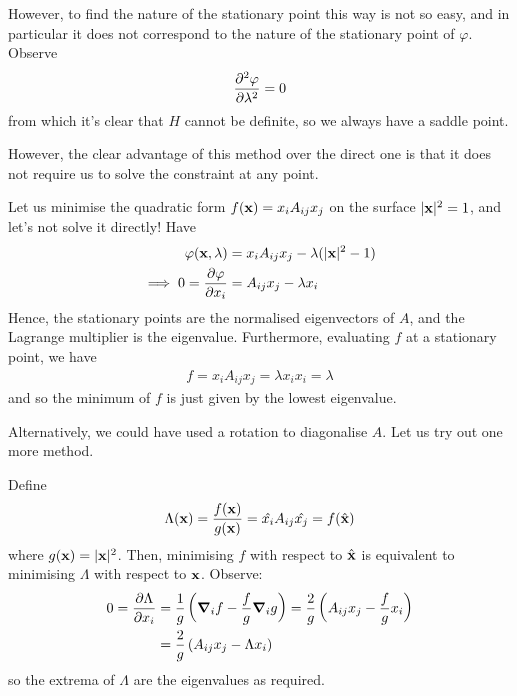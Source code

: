 \documentclass{../../template/note}
\begin{document}
    However, to find the nature of the stationary point this way is not so easy, and in particular it does not correspond to the nature of the stationary point of $\varphi$. Observe
    \begin{align*}
        \pd{^2\varphi}{\lambda^2} = 0
    \end{align*}
    from which it's clear that $H$ cannot be definite, so we always have a saddle point.

    However, the clear advantage of this method over the direct one is that it does not require us to solve the constraint at any point.
    
    \begin{example*}
        Let us minimise the quadratic form $f(\V x) = x_iA_{ij}x_j$ on the surface $|\V x|^2 = 1$, and let's not solve it directly! Have
        \begin{align*}
            \varphi(\V x, \lambda) &= x_i A_{ij} x_j - \lambda(|\V x|^2 - 1) \\
            \implies 0 = \pd{\varphi}{x_i} &= A_{ij} x_j - \lambda x_i
        \end{align*}
        Hence, the stationary points are the normalised eigenvectors of $A$, and the Lagrange multiplier is the eigenvalue. Furthermore, evaluating $f$ at a stationary point, we have
        \begin{align*}
            f = x_i A_{ij} x_j = \lambda x_i x_i = \lambda
        \end{align*}
        and so the minimum of $f$ is just given by the lowest eigenvalue.
    \end{example*}
    
    Alternatively, we could have used a rotation to diagonalise $A$. Let us try out one more method.
    
    \begin{example*}
        Define
        \begin{align*}
            \Lambda(\V x) = \frac{f(\V x)}{g(\V x)} = \hat{x_i} A_{ij} \hat{x_j} = f(\hvec x)
        \end{align*}
        where $g(\V x) = |\V x|^2$. Then, minimising $f$ with respect to $\hvec x$ is equivalent to minimising $\Lambda$ with respect to $\V x$. Observe:
        \begin{align*}
            0 = \pd{\Lambda}{x_i} &= \frac 1 g \left(\grad_i f - \frac f g \grad_i g\right) = \frac 2 g \left(A_{ij} x_j - \frac f g x_i\right) \\
            &= \frac 2 g \left(A_{ij}x_j - \Lambda x_i\right)
        \end{align*}
        so the extrema of $\Lambda$ are the eigenvalues as required.
    \end{example*}
    
\end{document}
